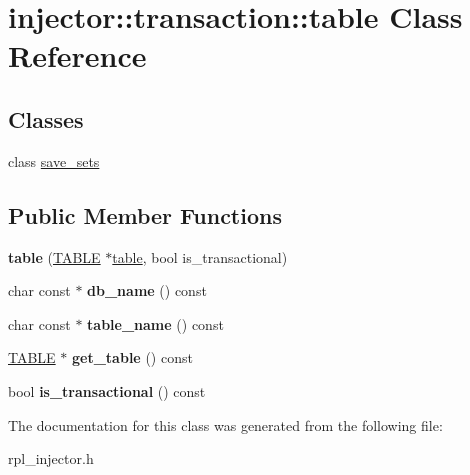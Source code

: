 \hypertarget{classinjector_1_1transaction_1_1table}{}\section{injector\+:\+:transaction\+:\+:table Class Reference}
\label{classinjector_1_1transaction_1_1table}
\subsection*{Classes}
\begin{DoxyCompactItemize}
\item 
class \mbox{\hyperlink{classinjector_1_1transaction_1_1table_1_1save__sets}{save\+\_\+sets}}
\end{DoxyCompactItemize}
\subsection*{Public Member Functions}
\begin{DoxyCompactItemize}
\item 
\mbox{\label{classinjector_1_1transaction_1_1table_a073f90deb71efbc1e480cbe132f8809b}} 
{\bfseries table} (\mbox{\hyperlink{structTABLE}{T\+A\+B\+LE}} $\ast$\mbox{\hyperlink{classinjector_1_1transaction_1_1table}{table}}, bool is\+\_\+transactional)
\item 
\mbox{\label{classinjector_1_1transaction_1_1table_a63f38557a9e47b3a19b91ccdcab88210}} 
char const  $\ast$ {\bfseries db\+\_\+name} () const
\item 
\mbox{\label{classinjector_1_1transaction_1_1table_ac1ccb06d7c5739f618323153007de39e}} 
char const  $\ast$ {\bfseries table\+\_\+name} () const
\item 
\mbox{\label{classinjector_1_1transaction_1_1table_a87df01fdfeaee9b5229323a28abfa20c}} 
\mbox{\hyperlink{structTABLE}{T\+A\+B\+LE}} $\ast$ {\bfseries get\+\_\+table} () const
\item 
\mbox{\label{classinjector_1_1transaction_1_1table_afe3eb5a58ede4cac40c11ca764d97b56}} 
bool {\bfseries is\+\_\+transactional} () const
\end{DoxyCompactItemize}


The documentation for this class was generated from the following file\+:\begin{DoxyCompactItemize}
\item 
rpl\+\_\+injector.\+h\end{DoxyCompactItemize}
